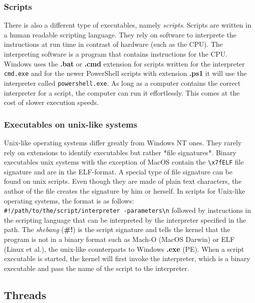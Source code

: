 \subsubsection{Scripts}

There is also a different type of executables, namely \textit{scripts}. Scripts are written in a human readable
scripting language. They rely on software to interprete the instructions at run time in contrast of
hardware (such as the CPU). The interpreting software is a program that contains instructions for
the CPU. Windows uses the \textbf{.bat} or \textbf{.cmd} extension for scripts written for the interpreter \texttt{cmd.exe} and for
the newer PowerShell scripts with extension \textbf{.ps1} it will use the interpreter called \texttt{powershell.exe}.
As long as a computer contains the correct interpreter for a script, the computer can run it effortlessly. This comes at
the cost of slower execution speeds.

\subsubsection{Executables on unix-like systems}

Unix-like operating systems differ greatly from Windows NT ones. They rarely rely on extensions to
identify executables but rather *file signatures*. Binary executables unix systems with the exception of MacOS
contain the \texttt{\textbackslash x7fELF} file signature and are in the ELF-format. A special type of file signature can be found on
unix scripts. Even though they are made of plain text characters, the author of the file creates the
signature by him or herself. In scripts for Unix-like operating systems, the format is as follows: \\
\texttt{\#!/path/to/the/script/interpreter -parameters\textbackslash n} followed by instructions in the scripting language that can
be interpreted by the interpreter specified in the path. The \textit{shebang} (\textbf{\#!}) is the script signature
and tells the kernel that the program is not in a binary format such as Mach-O (MacOS Darwin) or ELF (Linux et al.),
the unix-like counterparts to Windows \textbf{.exe} (PE). When a script executable is started,
the kernel will first invoke the interpreter, which is a binary executable and pass the name of the script
to the interpreter.


\subsection{Threads}

